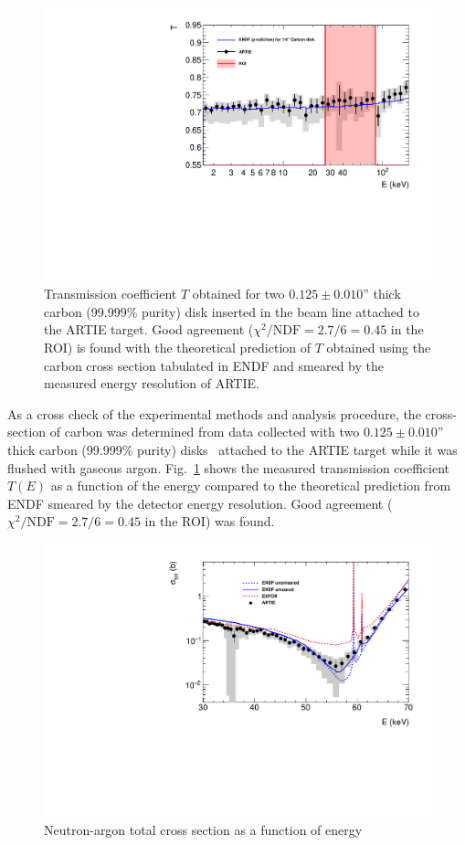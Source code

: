 \documentclass[%
 reprint,
superscriptaddress,
 preprintnumbers,
 nofootinbib,
 nobibnotes,
 bibnotes,
 amsmath,amssymb,
 aps,
 prl, 
 floatfix,
]{revtex4-1}
\begin{document}
\begin{figure}[htbp]\centering
\includegraphics[width=\linewidth]{Figures/carbon.pdf}
\caption{Transmission coefficient $T$ obtained for two $0.125\pm 0.010$” thick carbon (99.999\% purity) disk inserted in the beam line attached to the ARTIE target. Good agreement ($\chi^{2}/\text{NDF} = 2.7 / 6 = 0.45$ in the ROI) is found with the theoretical prediction of $T$ obtained using the carbon cross section tabulated in ENDF and smeared by the measured energy resolution of ARTIE.}
\label{fig:carbon}
\end{figure}

As a cross check of the experimental methods and analysis procedure,
the cross-section of carbon was determined from data collected with
two $0.125\pm 0.010$” thick carbon (99.999\% purity)
disks~\cite{CarbonLesker} attached to the ARTIE target while it was
flushed with gaseous argon.  Fig.~\ref{fig:carbon} shows the
measured transmission coefficient $T(E)$ as a function of the energy
compared to the theoretical prediction from ENDF smeared by the
detector energy resolution.  Good agreement
($\chi^{2}/\text{NDF} = 2.7 / 6 = 0.45$
in the ROI) was found.

\begin{figure}[h!]
    \centering
    \includegraphics[width=\linewidth]{Figures/cross-section.pdf}
    \caption{Neutron-argon total cross section as a function of energy}
    \label{fig:results}
\end{figure}
\end{document}
